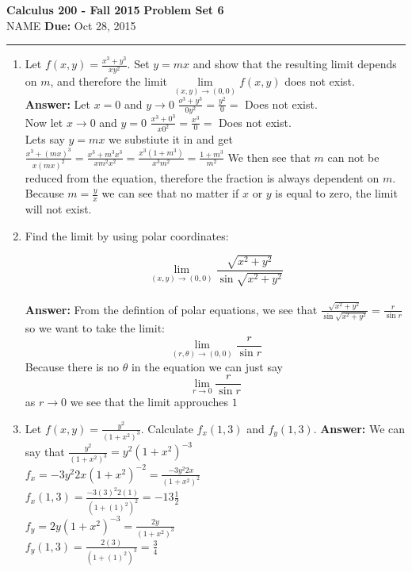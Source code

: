 \documentclass[11pt]{article}
\newcommand{\hwheadings}[3]{
{\bf Calculus 200 -  Fall 2015} \hfill {{\bf Problem Set #1}}\\
{{\bf } #2} \hfill {{\bf Due:} #3} \\
\rule[0.1in]{\textwidth}{0.025in}
}
\begin{document}
\hwheadings{6}{NAME}{Oct 28, 2015}


\begin{enumerate}


    
    
    
    \item Let $f(x,y) = \frac{x^3+y^3}{xy^2}$.  Set $y=mx$ and show that the resulting limit depends on $m$, and therefore the limit $\lim \limits_{(x,y) \to (0,0)} f(x,y)$ does not exist.
    \\
    \textbf{Answer:}
    Let $x=0$ and $y \rightarrow 0$ $ \frac{o^3+y^3}{0y^2}=\frac{y^2}{0}=$ Does not exist.
    \\
    Now let $x \rightarrow 0$ and $y=0$  $\frac{x^3+0^3}{x0^2}=\frac{x^3}{0}=$ Does not exist.
    \\
    Lets say $y=mx$ we substiute it in and get $ \frac{x^3+(mx)^3}{x(mx)^2}= \frac{x^3+m^3x^3}{xm^2x^2}=\frac{x^3(1+m^3)}{x^3m^2}=\frac{1+m^3}{m^2}$ We then see that $m$ can not be reduced from the equation, therefore the fraction is always dependent on $m$. Because $m=\frac{y}{x}$ we can see that no matter if $x$ or $y$ is equal to zero, the limit will not exist.
    
    \item Find the limit by using polar coordinates:
    
    \[ \lim_{(x,y) \to (0,0)}  \frac{\sqrt{x^2+y^2}}{\sin \sqrt{x^2+y^2}} \]
    \\
    \textbf{Answer:}
    From the defintion of polar equations, we see that $ \frac{\sqrt{x^2+y^2}}{\sin \sqrt{x^2+y^2}} = \frac{r}{\sin r}$ so we want to take the limit:
    \[
    \lim_{(r,\theta) \to (0,0)} \frac{r}{\sin r}
    \]
   Because there is no $\theta$ in the equation we can just say
   \[
    \lim_{r \to 0} \frac{r}{\sin r}
    \]
    as $r \rightarrow 0$ we see that the limit approuches $1$
    
    
    
    
    
    
    
    \item Let $f(x,y) = \frac{y^2}{(1+x^2)^3}$.  Calculate $f_x(1,3)$ and $f_y(1,3)$.
    \textbf{Answer:}
    We can say that $\frac{y^2}{(1+x^2)^3}= y^2(1+x^2)^{-3}$
    \\
    $f_x=-3y^2 2x (1+x^2)^{-2}=\frac{-3y^2 2x}{(1+x^2)^{2}}$
    \\
    $f_x(1,3)=\frac{-3(3)^2 2(1)}{(1+(1)^2)^{2}}=-13 \frac{1}{2}$
    \\
    $f_y=2y(1+x^2)^{-3}=\frac{2y}{(1+x^2)^3}$
    \\
    $f_y(1,3)=\frac{2(3)}{(1+(1)^2)^3}=\frac{3}{4}$
    

\end{enumerate}
\end{document}
